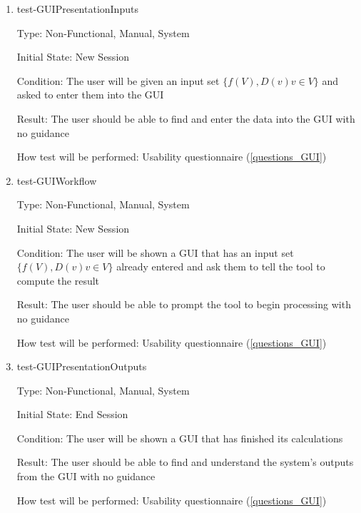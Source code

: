 \documentclass[12pt, titlepage]{article}
\begin{document}
\begin{enumerate}
	
	\item{test-GUIPresentationInputs}
	
	Type: Non-Functional, Manual, System
	
	Initial State: New Session
	
	Condition: The user will be given an input set $\{f(V), D(v) v \in V\}$ and 
	asked to enter them into the GUI
	
	Result: The user should be able to find and enter the data into the GUI 
	with no guidance
	
	How test will be performed: Usability questionnaire (\ref{questions_GUI})\\
	
	\item{test-GUIWorkflow}
	
	Type: Non-Functional, Manual, System
	
	Initial State: New Session
	
	Condition: The user will be shown a GUI that has an input set $\{f(V), D(v) 
	v \in V\}$ already entered and ask them to tell the tool to compute the 
	result
	
	Result: The user should be able to prompt the tool to begin processing with 
	no guidance
	
	How test will be performed: Usability questionnaire (\ref{questions_GUI})\\
	
	\item{test-GUIPresentationOutputs}
	
	Type: Non-Functional, Manual, System
	
	Initial State: End Session
	
	Condition: The user will be shown a GUI that has finished its calculations
	
	Result: The user should be able to find and understand the system's outputs 
	from the GUI with no guidance
	
	How test will be performed: Usability questionnaire (\ref{questions_GUI})\\
	
\end{enumerate}
\end{document}
